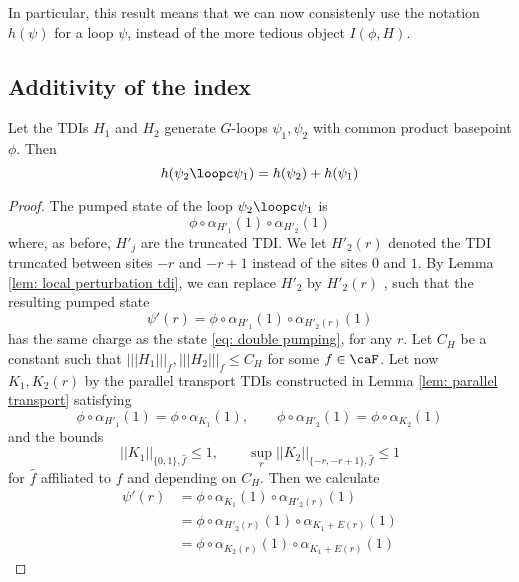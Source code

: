 In particular, this result means that we can now consistenly use the notation $h(\psi)$ for a loop $\psi$, instead of the more tedious object $I(\phi,H)$. 


\subsection{Additivity of the index}

\begin{lemma} \label{lem: additivity}
	Let the TDIs $H_1$ and $H_2$ generate $G$-loops $\psi_1,\psi_2 $ with common product basepoint $\phi$.  Then
	$$
	h(\psi_2\loopc \psi_1)=h(\psi_2)+h(\psi_1)
	$$
\end{lemma}

\begin{proof}
	The pumped state of the loop $\psi_2\loopc \psi_1$ is 
	\begin{equation}  \label{eq: double pumping}
		\phi \circ \alpha_{H'_1}(1) \circ \alpha_{H'_2}(1)
	\end{equation}
	where, as before, $H'_{j}$ are the truncated TDI. We let  $H'_2(r)$ denoted the TDI truncated between sites $-r$ and $-r+1$ instead of the sites $0$ and $1$. By Lemma \ref{lem: local perturbation tdi}, we can replace $H'_2$ by $H'_2(r)$ , such that the resulting pumped state
	$$
	\psi'(r)=\phi \circ \alpha_{H'_1}(1) \circ \alpha_{H'_2(r)}(1)
	$$
	has the same charge as  the state \eqref{eq: double pumping}, for any $r$. 
	Let $C_H$ be a constant such that $|||H_1|||_f,|||H_2|||_f\leq C_H$ for some $f\in\caF$.
	Let now $K_1,K_2(r)$ by the parallel transport TDIs constructed in Lemma \ref{lem: parallel transport} satisfying
	\begin{equation}\label{eq: parallel for truncated pair}
		\phi \circ \alpha_{H'_1}(1)=\phi \circ \alpha_{K_1}(1) ,\qquad\phi \circ \alpha_{H'_2}(1)=\phi \circ \alpha_{K_2}(1)
	\end{equation}
	and the bounds 
	$$
	||K_1||_{\{0,1\}, \hat{f}} \leq  1,\qquad  \sup_r ||K_2||_{\{-r,-r+1\}, \hat{f}} \leq  1 
	$$
	for $\hat{f}$ affiliated to $f$ and depending on $C_H$.
	Then we calculate 
	\begin{align}
		\psi'(r) &= \phi \circ \alpha_{K_1}(1) \circ \alpha_{H'_2(r)}(1) \nonumber\\
		&=\phi \circ \alpha_{H'_2(r)}(1) \circ \alpha_{K_1+E(r)}(1) \nonumber \\
		&=\phi \circ \alpha_{K_2(r)}(1) \circ \alpha_{K_1+E(r)}(1)\label{eq: double pumped repeat} 
	\end{align}

\end{proof}
